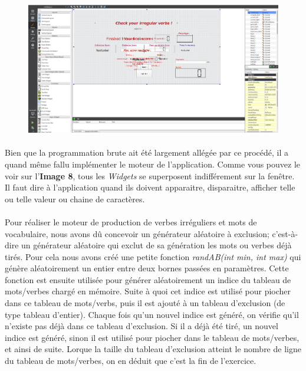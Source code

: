 \documentclass[12pt, a4paper]{report}
\begin{document}
\begin{figure}[H]
    \centering
    \includegraphics[scale=0.34]{images/qtcreator.png}
\end{figure}

\paragraph{}Bien que la programmation brute ait été largement allégée par ce procédé, il a quand même fallu implémenter le moteur de l'application. Comme vous pouvez le voir sur l'\textbf{Image 8}, tous les \textit{Widgets} se superposent indifférement sur la fenêtre. Il faut dire à l'application quand ils doivent apparaitre, disparaitre, afficher telle ou telle valeur ou chaine de caractères.

\paragraph{}Pour réaliser le moteur de production de verbes irréguliers et mots de vocabulaire, nous avons dû concevoir un générateur aléatoire à exclusion; c'est-à-dire un générateur aléatoire qui exclut de sa génération les mots ou verbes déjà tirés. Pour cela nous avons créé une petite fonction \textit{randAB(int min, int max)} qui génère aléatoirement un entier entre deux bornes passées en paramètres. Cette fonction est ensuite utilisée pour générer aléatoirement un indice du tableau de mots/verbes chargé en mémoire. Suite à quoi cet indice est utilisé pour piocher dans ce tableau de mots/verbs, puis il est ajouté à un tableau d'exclusion (de type tableau d'entier). Chaque fois qu'un nouvel indice est généré, on vérifie qu'il n'existe pas déjà dans ce tableau d'exclusion. Si il a déjà été tiré, un nouvel indice est généré, sinon il est utilisé pour piocher dans le tableau de mots/verbes, et ainsi de suite. Lorque la taille du tableau d'exclusion atteint le nombre de ligne du tableau de mots/verbes, on en déduit que c'est la fin de l'exercice.
\end{document}
